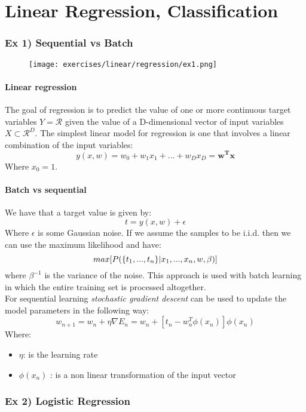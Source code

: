 \section{Linear Regression, Classification}

\subsubsection{Ex 1) Sequential vs Batch }

\begin{figure}[H]
    \centering
    \texttt{[image: exercises/linear/regression/ex1.png]}
\end{figure}
 

\paragraph{Linear regression}
The goal of regression is to predict the value of one or more continuous target variables $Y=\mathcal{R}$ given the value of a D-dimensional vector of input variables $X \subset \mathcal{R}^D$. The simplest linear model for regression is one that involves a linear combination of the input variables:
\[y(x,w)=w_0+w_1x_1+...+w_Dx_D=\bm{w^Tx}\]
Where $x_0=1$.

\paragraph{Batch vs sequential}


We have that a target value is given by:
\[t=y(x,w) + \epsilon\]
Where $\epsilon$ is some Gaussian noise. If we assume the samples to be i.i.d. then we can use the maximum likelihood and have:
\[max[P(\lbrace{t_1,...,t_n}\rbrace|x_1,...,x_n,w,\beta)]\]
where $\beta^{-1}$ is the variance of the noise. This approach is used with batch learning in which the entire training set is processed altogether.\\

For sequential learning \textit{stochastic gradient descent} can be used to update the model parameters in the following way:
\[w_{n+1}=w_n+\eta \nabla E_n= w_n +[t_n -w_n^T \phi(x_n)]\phi(x_n)\]
Where:
\begin{itemize}
\item $\eta$: is the learning rate 
\item $\phi(x_n)$ : is a non linear transformation of the input vector
\end{itemize}

\subsubsection{Ex 2) Logistic Regression }

